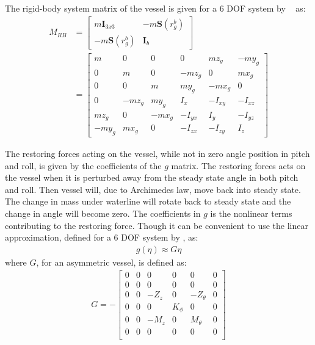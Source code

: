 The rigid-body system matrix of the vessel is given for a 6 \ac{DOF} system by ~\citep[eq. ()]{fossen} as:
\begin{align}
M_{RB} &=
\begin{bmatrix}
m\boldsymbol{I}_{3x3} & -m\boldsymbol{S}(r^b_g)\\
-m\boldsymbol{S}(r^b_g) & \boldsymbol{I}_b
\end{bmatrix}
\nonumber\\
&=
\begin{bmatrix}
m & 0 & 0 & 0 & mz_g & -my_g\\
0 & m & 0 & -mz_g & 0 & mx_g\\
0 & 0 & m & my_g & -mx_g & 0\\
0 & -mz_g & my_g & I_x & -I_{xy} & -I_{xz}\\
mz_g & 0 & -mx_g & -I_{yx} & I_y & -I_{yz}\\
-my_g & mx_g & 0 & -I_{zx} & -I_{zy} & I_z
\end{bmatrix}
\end{align}

The restoring forces acting on the vessel, while not in zero angle position in pitch and roll, is given by the coefficients of the $g$ matrix. The restoring forces acts on the vessel when it is perturbed away from the steady state angle in both pitch and roll. Then vessel will, due to Archimedes law, move back into steady state. The change in mass under waterline will rotate back to steady state and the change in angle will become zero. The coefficients in $g$ is the nonlinear terms contributing to the restoring force. Though it can be convenient to use the linear approximation, defined for a 6 \ac{DOF} system by \citep{fossen}, as:
\begin{align}
g(\eta) \approx G\eta
\end{align}
where $G$, for an asymmetric vessel, is defined as:
\begin{align}
G = -
\begin{bmatrix}
0 & 0 & 0 & 0 & 0 & 0\\
0 & 0 & 0 & 0 & 0 & 0\\
0 & 0 & -Z_z & 0 & -Z_\theta & 0\\
0 & 0 & 0 & K_\phi & 0 & 0\\
0 & 0 & -M_z & 0 & M_\theta & 0\\
0 & 0 & 0 & 0 & 0 & 0\\
\end{bmatrix}
\end{align}

